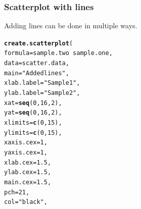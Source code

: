 \documentclass[letterpaper]{article}\usepackage[]{graphicx}\usepackage[]{color}
\makeatletter
\newcommand{\hlnum}[1]{\textcolor[rgb]{0.686,0.059,0.569}{#1}}%
\newcommand{\hlstr}[1]{\textcolor[rgb]{0.192,0.494,0.8}{#1}}%
\newcommand{\hlopt}[1]{\textcolor[rgb]{0,0,0}{#1}}%
\newcommand{\hlstd}[1]{\textcolor[rgb]{0.345,0.345,0.345}{#1}}%
\newcommand{\hlkwc}[1]{\textcolor[rgb]{0.333,0.667,0.333}{#1}}%
\newcommand{\hlkwd}[1]{\textcolor[rgb]{0.737,0.353,0.396}{\textbf{#1}}}%
\newenvironment{kframe}{%
 \def\at@end@of@kframe{}%
 \ifinner\ifhmode%
  \def\at@end@of@kframe{\end{minipage}}%
  \begin{minipage}{\columnwidth}%
 \fi\fi%
 \def\FrameCommand##1{\hskip\@totalleftmargin \hskip-\fboxsep
 \colorbox{shadecolor}{##1}\hskip-\fboxsep
     \hskip-\linewidth \hskip-\@totalleftmargin \hskip\columnwidth}%
 \MakeFramed {\advance\hsize-\width
   \@totalleftmargin\z@ \linewidth\hsize
   \@setminipage}}%
 {\par\unskip\endMakeFramed%
 \at@end@of@kframe}
\newenvironment{knitrout}{}{} %
\makeatother
\begin{document}
\subsubsection{Scatterplot with lines}
Adding lines can be done in multiple ways.
\begin{knitrout}
\color{fgcolor}\begin{kframe}
\begin{alltt}
\hlkwd{create.scatterplot}\hlstd{(}
    \hlkwc{formula} \hlstd{= sample.two} \hlopt{~} \hlstd{sample.one,}
    \hlkwc{data} \hlstd{= scatter.data,}
    \hlkwc{main} \hlstd{=} \hlstr{"Added lines"}\hlstd{,}
    \hlkwc{xlab.label} \hlstd{=} \hlstr{"Sample 1"}\hlstd{,}
    \hlkwc{ylab.label} \hlstd{=} \hlstr{"Sample 2"}\hlstd{,}
    \hlkwc{xat} \hlstd{=} \hlkwd{seq}\hlstd{(}\hlnum{0}\hlstd{,} \hlnum{16}\hlstd{,} \hlnum{2}\hlstd{),}
    \hlkwc{yat} \hlstd{=} \hlkwd{seq}\hlstd{(}\hlnum{0}\hlstd{,} \hlnum{16}\hlstd{,} \hlnum{2}\hlstd{),}
    \hlkwc{xlimits} \hlstd{=} \hlkwd{c}\hlstd{(}\hlnum{0}\hlstd{,} \hlnum{15}\hlstd{),}
    \hlkwc{ylimits} \hlstd{=} \hlkwd{c}\hlstd{(}\hlnum{0}\hlstd{,} \hlnum{15}\hlstd{),}
    \hlkwc{xaxis.cex} \hlstd{=} \hlnum{1}\hlstd{,}
    \hlkwc{yaxis.cex} \hlstd{=} \hlnum{1}\hlstd{,}
    \hlkwc{xlab.cex} \hlstd{=} \hlnum{1.5}\hlstd{,}
    \hlkwc{ylab.cex} \hlstd{=} \hlnum{1.5}\hlstd{,}
    \hlkwc{main.cex} \hlstd{=} \hlnum{1.5}\hlstd{,}
    \hlkwc{pch} \hlstd{=} \hlnum{21}\hlstd{,}
    \hlkwc{col} \hlstd{=} \hlstr{"black"}\hlstd{,}


\end{alltt}
\end{kframe}
\end{knitrout}
\end{document}
